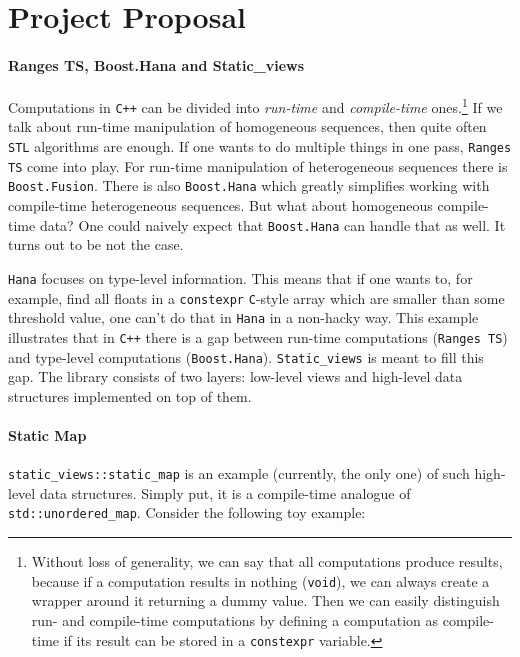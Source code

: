 \documentclass[a4paper,12pt]{article}
\begin{document}
\newpage
\section*{Project Proposal}
    \paragraph{Ranges TS, Boost.Hana and Static\_views} Computations in
    \texttt{C++} can be divided into \textit{run-time} and \textit{compile-time}
    ones.\footnote{%
        Without loss of generality, we can say that all computations produce
        results, because if a computation results in nothing (\texttt{void}), we
        can always create a wrapper around it returning a dummy value. Then we
        can easily distinguish run- and compile-time computations by defining a
        computation as compile-time if its result can be stored in a
        \texttt{constexpr} variable.%
    }
    If we talk about run-time manipulation of homogeneous sequences, then quite
    often \texttt{STL} algorithms\cite{stl-algorithms} are enough. If one wants
    to do multiple things in one pass, \texttt{Ranges TS}\cite{ranges-ts} come
    into play. For run-time manipulation of heterogeneous sequences there is
    \texttt{Boost.Fusion}\cite{boost-fusion}. There is also
    \texttt{Boost.Hana}\cite{boost-hana} which greatly simplifies working with
    compile-time heterogeneous sequences.  But what about homogeneous
    compile-time data? One could naively expect that \texttt{Boost.Hana} can
    handle that as well. It turns out to be not the case.

    \texttt{Hana} focuses on type-level information. This means that if one
    wants to, for example, find all floats in a \texttt{constexpr}
    \texttt{C}-style array which are smaller than some threshold value, one
    can't do that in \texttt{Hana} in a non-hacky way.  This example illustrates
    that in \texttt{C++} there is a gap between run-time computations
    (\texttt{Ranges TS}) and type-level computations (\texttt{Boost.Hana}).
    \texttt{Static\_views} is meant to fill this gap. The library consists of
    two layers: low-level views and high-level data structures implemented on
    top of them.

    \paragraph{Static Map} \texttt{static\_views::static\_map} is an example
    (currently, the only one) of such high-level data structures. Simply put, it
    is a compile-time analogue of \texttt{std::unordered\_map}. Consider the
    following toy example:
\end{document}
